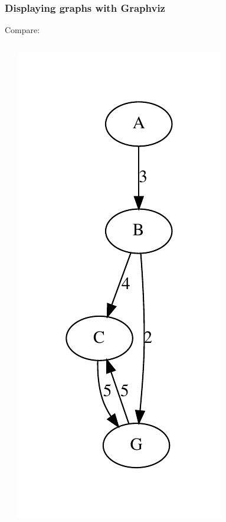 \begin{frame}[fragile]\frametitle{Displaying graphs with Graphviz}

  Compare:

  \begin{columns}[t]
    \vspace{2cm}
  \begin{center}
    
  \end{center}
  \begin{center}
    \includegraphics[scale=0.5]{Figures/small_graph_gen_graphviz.pdf}
  \end{center}
\end{columns}

\end{frame}



